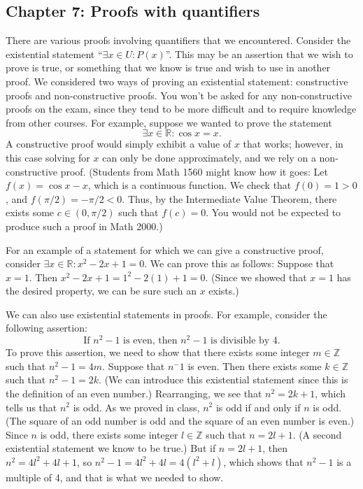 \documentclass[letterpaper,12pt]{article}
\newcommand{\Z}{\mathbb{Z}}
\newcommand{\R}{\mathbb{R}}
\begin{document}
\subsection*{Chapter 7: Proofs with quantifiers}
There are various proofs involving quantifiers that we encountered. Consider the existential statement ``$\exists x\in U: P(x)$''. This may be an assertion that we wish to prove is true, or something that we know is true and wish to use in another proof. We considered two ways of proving an existential statement: constructive proofs and non-constructive proofs. You won't be asked for any non-constructive proofs on the exam, since they tend to be more difficult and to require knowledge from other courses. For example, suppose we wanted to prove the statement
\[
\exists x\in\R : \cos x = x.
\]
A constructive proof would simply exhibit a value of $x$ that works; however, in this case solving for $x$ can only be done approximately, and we rely on a non-constructive proof. (Students from Math 1560 might know how it goes: Let $f(x)=\cos x - x$, which is a continuous function. We check that $f(0)=1>0$, and $f(\pi/2) = -\pi/2<0$. Thus, by the Intermediate Value Theorem, there exists some $c\in (0,\pi/2)$ such that $f(c)=0$. You would not be expected to produce such a proof in Math 2000.)

For an example of a statement for which we can give a constructive proof, consider $\exists x\in \R : x^2-2x+1=0$. We can prove this as follows: Suppose that $x=1$. Then $x^2-2x+1 = 1^2-2(1)+1 = 0$. (Since we showed that $x=1$ has the desired property, we can be sure such an $x$ exists.)

We can also use existential statements in proofs. For example, consider the following assertion:
\[
\text{If } n^2-1 \text{ is even, then } n^2-1 \text{ is divisible by 4}.
\]
To prove this assertion, we need to show that there exists some integer $m\in \Z$ such that $n^2-1 = 4m$. Suppose that $n^-1$ is even. Then there exists some $k\in \Z$ such that $n^2-1 = 2k$. (We can introduce this existential statement since this is the definition of an even number.) Rearranging, we see that $n^2=2k+1$, which tells us that $n^2$ is odd. As we proved in class, $n^2$ is odd if and only if $n$ is odd. (The square of an odd number is odd and the square of an even number is even.) Since $n$ is odd, there exists some integer $l\in\Z$ such that $n=2l+1$. (A second existential statement we know to be true.)
But if $n=2l+1$, then $n^2 = 4l^2+4l+1$, so $n^2-1 = 4l^2+4l=4(l^2+l)$, which shows that $n^2-1$ is a multiple of 4, and that is what we needed to show.
\end{document}
